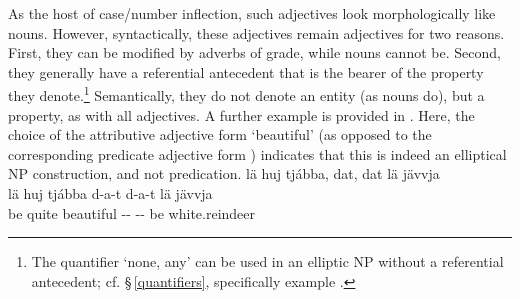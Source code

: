 As the host of case/number inflection, such adjectives look morphologically like nouns. %
However, syntactically, these adjectives remain adjectives for two reasons. First, they can be modified by adverbs of grade, while nouns cannot be. Second, they generally have a referential antecedent that is the bearer of the property they denote.\footnote{The quantifier  ‘none, any’ can be used in an elliptic NP without a referential antecedent; cf. §\,\ref{quantifiers}, specifically example .} 
Semantically, they do not denote an entity (as nouns do), but a property, as with all adjectives. 
A further example is provided in . 
Here, the choice of the attributive adjective form  ‘beautiful’ (as opposed to the corresponding predicate adjective form ) indicates that this is indeed an elliptical NP construction, and not predication. 
\ea\label{adjNPheadEx4}
\glll	lä huj tjábba, dat, dat lä jävvja\\
	lä huj tjábba d-a-t d-a-t lä jävvja\\
	be\BS{} quite beautiful\BS{} -- -- be\BS{} white.reindeer\BS{}\\\nopagebreak
{}	
\z




